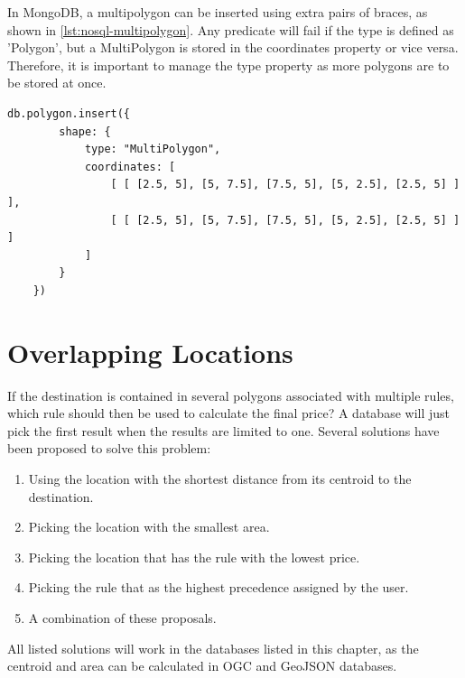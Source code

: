 In MongoDB, a multipolygon can be inserted using extra pairs of braces, as shown in \ref{lst:nosql-multipolygon}. Any predicate will fail if the type is defined as 'Polygon', but a MultiPolygon is stored in the coordinates property or vice versa. Therefore, it is important to manage the type property as more polygons are to be stored at once.

\begin{lstlisting}[caption={Insert one multipolygon in MongoDB.}, label={lst:nosql-multipolygon}]
	db.polygon.insert({
		shape: {
			type: "MultiPolygon",
			coordinates: [
				[ [ [2.5, 5], [5, 7.5], [7.5, 5], [5, 2.5], [2.5, 5] ] ],
				[ [ [2.5, 5], [5, 7.5], [7.5, 5], [5, 2.5], [2.5, 5] ] ]
			]
		}
	})
\end{lstlisting}

\section{Overlapping Locations}
If the destination is contained in several polygons associated with multiple rules, which rule should then be used to calculate the final price? A database will just pick the first result when the results are limited to one. Several solutions have been proposed to solve this problem:

\begin{enumerate}
	\item Using the location with the shortest distance from its centroid to the destination.
	\item Picking the location with the smallest area.
	\item Picking the location that has the rule with the lowest price.
	\item Picking the rule that as the highest precedence assigned by the user.
	\item A combination of these proposals.
\end{enumerate}

All listed solutions will work in the databases listed in this chapter, as the centroid and area can be calculated in OGC and GeoJSON databases.

%
